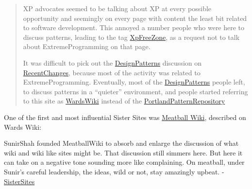 \begin{quote}
XP advocates seemed to be talking about XP at every possible opportunity
and seemingly on every page with content the least bit related to
software development. This annoyed a number people who were here to
discuss patterns, leading to the tag
\href{http://wiki.c2.com/?XpFreeZone}{XpFreeZone}, as a request not to
talk about ExtremeProgramming on that page.

It was difficult to pick out the
\href{http://wiki.c2.com/?DesignPatterns}{DesignPatterns} discussion on
\href{http://wiki.c2.com/?RecentChanges}{RecentChanges},
because most of the activity was related to ExtremeProgramming.
Eventually, most of the
\href{http://wiki.c2.com/?DesignPatterns}{DesignPatterns} people left,
to discuss patterns in a ``quieter'' environment, and people started
referring to this site as
\href{http://wiki.c2.com/?WardsWiki}{WardsWiki} instead of the
\href{http://wiki.c2.com/?PortlandPatternRepository}{PortlandPatternRepository}
\citep{C2wikiWikiHistory} 
\end{quote}

One of the first and most influential Sister Sites was
\href{http://meatballwiki.org/}{Meatball Wiki}, described on Wards Wiki:

\begin{leftbar}
SunirShah founded MeatballWiki to absorb and enlarge the discussion of
what wiki and wiki like sites might be. That discussion still simmers
here. But here it can take on a negative tone sounding more like
complaining. On meatball, under Sunir's careful leadership, the ideas,
wild or not, stay amazingly upbeat. -
\href{http://wiki.c2.com/?SisterSites}{SisterSites}
\end{leftbar}

